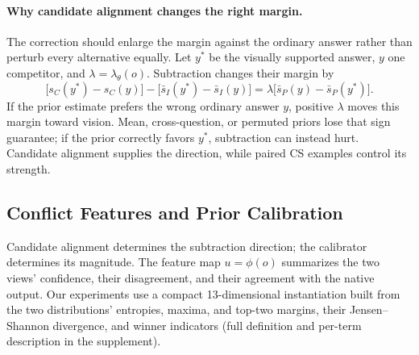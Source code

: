 \documentclass[letterpaper]{article}
\begin{document}
\paragraph{Why candidate alignment changes the right margin.}
The correction should enlarge the margin against the ordinary answer rather
than perturb every alternative equally. Let \(y^*\) be the visually supported
answer, \(y\) one competitor, and \(\lambda=\lambda_\theta(o)\). Subtraction
changes their margin by
\begin{equation}
\bigl[s_C(y^*)-s_C(y)\bigr]
-\bigl[\bar s_I(y^*)-\bar s_I(y)\bigr]
=\lambda\bigl[\bar s_P(y)-\bar s_P(y^*)\bigr].
\label{eq:margin-shift}
\end{equation}
If the prior estimate prefers the wrong ordinary answer \(y\), positive
\(\lambda\) moves this margin toward vision. Mean, cross-question, or permuted
priors lose that sign guarantee; if the prior correctly favors \(y^*\),
subtraction can instead hurt. Candidate alignment supplies the direction,
while paired CS examples control its strength.

\subsection{Conflict Features and Prior Calibration}

Candidate alignment determines the subtraction direction; the calibrator
determines its magnitude.
The feature map $u=\phi(o)$ summarizes the two views' confidence, their
disagreement, and their agreement with the native output. Our experiments use a compact
13-dimensional instantiation built from the two distributions' entropies,
maxima, and top-two margins, their Jensen--Shannon divergence, and winner
indicators (full definition and per-term description in the supplement).
\end{document}
